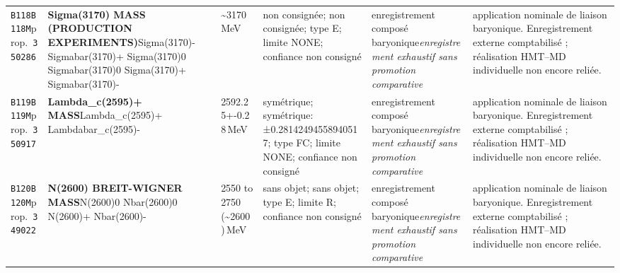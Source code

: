 \begin{landscape}
\begin{longtable}{L{1.85cm}L{4.45cm}L{2.35cm}L{4.05cm}L{3.35cm}L{7.15cm}}
\texttt{B118}\newline \texttt{B118M}\newline prop.\ \texttt{350286} & \textbf{Sigma(3170) MASS (PRODUCTION EXPERIMENTS)}\newline Sigma(3170)- \textbar{}\allowbreak{} Sigmabar(3170)+ \textbar{}\allowbreak{} Sigma(3170)0 \textbar{}\allowbreak{} Sigmabar(3170)0 \textbar{}\allowbreak{} Sigma(3170)+ \textbar{}\allowbreak{} Sigmabar(3170)- & \textasciitilde{}3170\,MeV & non consignée; non consignée; type E; limite NONE; confiance non consigné & enregistrement composé baryonique\newline \emph{enregistrement exhaustif sans promotion comparative} & application nominale de liaison baryonique. Enregistrement externe comptabilisé ; réalisation HMT--MD individuelle non encore reliée. \\
\texttt{B119}\newline \texttt{B119M}\newline prop.\ \texttt{350917} & \textbf{Lambda\_\allowbreak{}c(2595)+ MASS}\newline Lambda\_\allowbreak{}c(2595)+ \textbar{}\allowbreak{} Lambdabar\_\allowbreak{}c(2595)- & 2592.25+-0.28\,MeV & symétrique; symétrique: ±0.28142494558940517; type FC; limite NONE; confiance non consigné & enregistrement composé baryonique\newline \emph{enregistrement exhaustif sans promotion comparative} & application nominale de liaison baryonique. Enregistrement externe comptabilisé ; réalisation HMT--MD individuelle non encore reliée. \\
\texttt{B120}\newline \texttt{B120M}\newline prop.\ \texttt{349022} & \textbf{N(2600) BREIT-WIGNER MASS}\newline N(2600)0 \textbar{}\allowbreak{} Nbar(2600)0 \textbar{}\allowbreak{} N(2600)+ \textbar{}\allowbreak{} Nbar(2600)- & 2550 to 2750 (\textasciitilde{}2600)\,MeV & sans objet; sans objet; type E; limite R; confiance non consigné & enregistrement composé baryonique\newline \emph{enregistrement exhaustif sans promotion comparative} & application nominale de liaison baryonique. Enregistrement externe comptabilisé ; réalisation HMT--MD individuelle non encore reliée. \\

\end{longtable}
\end{landscape}
